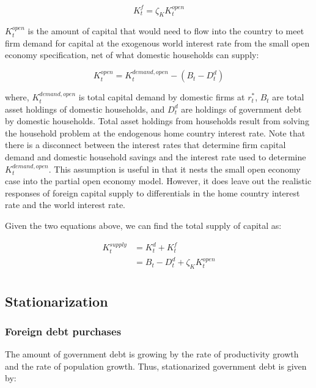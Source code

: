 \begin{equation}
  K^{f}_{t} = \zeta_{K}K^{open}_{t}
\end{equation}

$K^{open}_{t}$ is the amount of capital that would need to flow into the country to meet firm demand for capital at the exogenous world interest rate from the small open economy specification, net of what domestic households can supply:

\begin{equation}
  K^{open}_{t} = K^{demand, open}_{t} - (B_{t} - D^{d}_{t})
\end{equation}

where, $K^{demand, open}_{t}$ is total capital demand by domestic firms at $r^
{*}_{t}$, $B_{t}$ are total asset holdings of domestic households, and $D^{d}_{t}$ are holdings of government debt by domestic households.  Total asset holdings from households result from solving the household problem at the endogenous home country interest rate.  Note that there is a disconnect between the interest rates that determine firm capital demand and domestic household savings and the interest rate used to determine $K^{demand, open}_{t}$.  This assumption is useful in that it nests the small open economy case into the partial open economy model.  However, it does leave out the realistic responses of foreign capital supply to differentials in the home country interest rate and the world interest rate.

Given the two equations above, we can find the total supply of capital as:

\begin{equation}
  \begin{split}
  K^{supply}_{t} & = K^{d}_{t} + K^{f}_{t} \\
   & = B_{t} - D^{d}_{t} + \zeta_{K}K^{open}_{t} \\
  \end{split}
\end{equation}


\subsection{Stationarization}

\subsubsection{Foreign debt purchases}

The amount of government debt is growing by the rate of productivity growth and the rate of population growth.  Thus, stationarized government debt is given by:

